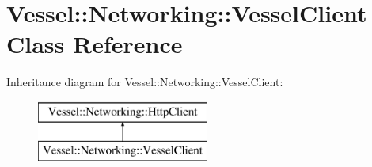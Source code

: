\hypertarget{class_vessel_1_1_networking_1_1_vessel_client}{}\section{Vessel\+:\+:Networking\+:\+:Vessel\+Client Class Reference}
\label{class_vessel_1_1_networking_1_1_vessel_client}
Inheritance diagram for Vessel\+:\+:Networking\+:\+:Vessel\+Client\+:\begin{figure}[H]
\begin{center}
\leavevmode
\includegraphics[height=2.000000cm]{class_vessel_1_1_networking_1_1_vessel_client}
\end{center}
\end{figure}
